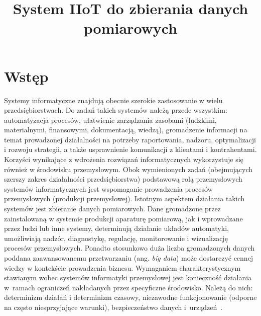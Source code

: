 \documentclass[a4paper, 12pt, twoside]{article}
\title{System IIoT do zbierania danych pomiarowych}
\date{}
\begin{document}
\clearpage\maketitle %
\thispagestyle{empty}

\listoftodos

\newpage

\tableofcontents

\section{Wstęp}\label{intro}

Systemy informatyczne znajdują obecnie szerokie zastosowanie w wielu przedsiębiorstwach.
Do zadań takich systemów należą przede wszystkim: automatyzacja procesów,
ułatwienie zarządzania zasobami (ludzkimi, materialnymi, finansowymi, dokumentacją, wiedzą),
gromadzenie informacji na temat prowadzonej
działalności na potrzeby raportowania, nadzoru, optymalizacji i rozwoju strategii, a także
usprawnienie komunikacji z klientami i kontrahentami. Korzyści wynikające z wdrożenia
rozwiązań informatycznych wykorzystuje się również w środowisku
przemysłowym. Obok wymienionych zadań (obejmujących szerszy zakres działalności
przedsiębiorstwa) podstawową rolą przemysłowych systemów informatycznych
jest wspomaganie prowadzenia procesów przemysłowych (produkcji przemysłowej).
Istotnym aspektem działania takich systemów
jest zbieranie danych pomiarowych. Dane gromadzone przez zainstalowaną w systemie produkcji
aparaturę pomiarową, jak i wprowadzane przez ludzi lub inne systemy, determinują działanie układów automatyki,
umożliwiają nadzór, diagnostykę, regulację, monitorowanie i wizualizację procesów przemysłowych.
Ponadto stosunkowo duża liczba gromadzonych danych poddana zaawansowanemu przetwarzaniu
(ang. \emph{big data})
może dostarczyć cennej wiedzy w kontekście prowadzenia biznesu.
Wymaganiem charakterystycznym stawianym wobec systemów informatyki przemysłowej
jest konieczność działania w~ramach ograniczeń nakładanych przez specyficzne środowisko.
Należą do nich: determinizm działań i determinizm czasowy, niezawodne funkcjonowanie (odporne
na często niesprzyjające warunki), bezpieczeństwo danych i~urządzeń~\cite{isp}.
\end{document}
